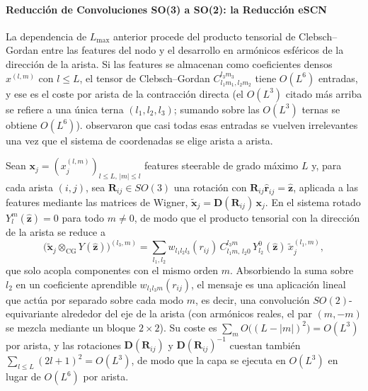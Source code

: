 \paragraph{Reducción de Convoluciones SO(3) a SO(2): la Reducción eSCN}

La dependencia de $L_{\max}$ anterior procede del producto tensorial de Clebsch--Gordan entre las features del nodo y el desarrollo en armónicos esféricos de la dirección de la arista. Si las features se almacenan como coeficientes densos $x^{(l,m)}$ con $l \le L$, el tensor de Clebsch--Gordan $C^{l_3 m_3}_{l_1 m_1, l_2 m_2}$ tiene $O(L^6)$ entradas, y ese es el coste por arista de la contracción directa (el $O(L^3)$ citado más arriba se refiere a una única terna $(l_1, l_2, l_3)$; sumando sobre las $O(L^3)$ ternas se obtiene $O(L^6)$). \citet{passaro2023escn} observaron que casi todas esas entradas se vuelven irrelevantes una vez que el sistema de coordenadas se elige arista a arista.

\begin{proposition}\label{prop:escn_reduccion}
Sean $\mathbf{x}_j = (x_j^{(l,m)})_{l \le L,\, |m| \le l}$ features steerable de grado máximo $L$ y, para cada arista $(i,j)$, sea $\mathbf{R}_{ij} \in SO(3)$ una rotación con $\mathbf{R}_{ij}\hat{\mathbf{r}}_{ij} = \hat{\mathbf{z}}$, aplicada a las features mediante las matrices de Wigner, $\tilde{\mathbf{x}}_j = \mathbf{D}(\mathbf{R}_{ij})\,\mathbf{x}_j$. En el sistema rotado $Y_l^m(\hat{\mathbf{z}}) = 0$ para todo $m \neq 0$, de modo que el producto tensorial con la dirección de la arista se reduce a
\[\Big(\tilde{\mathbf{x}}_j \otimes_{\text{CG}} Y(\hat{\mathbf{z}})\Big)^{(l_3, m)} = \sum_{l_1, l_2} w_{l_1 l_2 l_3}(r_{ij})\, C^{l_3 m}_{l_1 m,\, l_2 0}\, Y_{l_2}^{0}(\hat{\mathbf{z}})\, \tilde{x}_j^{(l_1, m)},\]
que solo acopla componentes con el mismo orden $m$. Absorbiendo la suma sobre $l_2$ en un coeficiente aprendible $w_{l_1 l_3 m}(r_{ij})$, el mensaje es una aplicación lineal que actúa por separado sobre cada modo $m$, es decir, una convolución $SO(2)$-equivariante alrededor del eje de la arista (con armónicos reales, el par $(m, -m)$ se mezcla mediante un bloque $2 \times 2$). Su coste es $\sum_{m} O\big((L - |m|)^2\big) = O(L^3)$ por arista, y las rotaciones $\mathbf{D}(\mathbf{R}_{ij})$ y $\mathbf{D}(\mathbf{R}_{ij})^{-1}$ cuestan también $\sum_{l \le L} (2l+1)^2 = O(L^3)$, de modo que la capa se ejecuta en $O(L^3)$ en lugar de $O(L^6)$ por arista.
\end{proposition}

